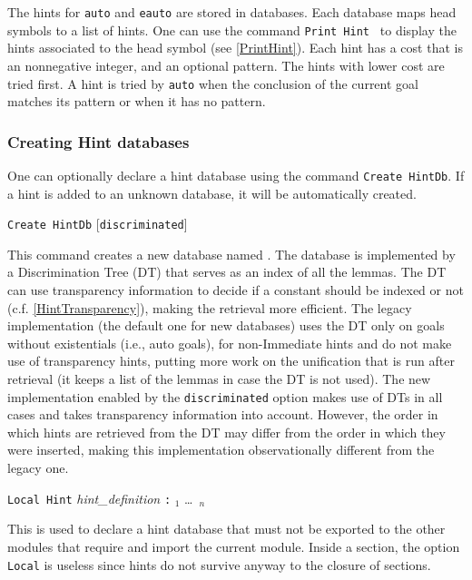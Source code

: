 \begin{coq_example*}
The hints for \texttt{auto} and \texttt{eauto} are stored in
databases.  Each database maps head symbols to a list of hints. One can
use the command \texttt{Print Hint \ident} to display the hints
associated to the head symbol \ident{} (see \ref{PrintHint}). Each
hint has a cost that is an nonnegative integer, and an optional pattern.
The hints with lower cost are tried first. A hint is tried by
\texttt{auto} when the conclusion of the current goal
matches its pattern or when it has no pattern.

\subsubsection*{Creating Hint databases
  \label{CreateHintDb}}

One can optionally declare a hint database using the command
\texttt{Create HintDb}. If a hint is added to an unknown database, it
will be automatically created.

\medskip
\texttt{Create HintDb} {\ident} [\texttt{discriminated}]
\medskip

This command creates a new database named \ident.
The database is implemented by a Discrimination Tree (DT) that serves as
an index of all the lemmas. The DT can use transparency information to decide
if a constant should be indexed or not (c.f. \ref{HintTransparency}),
making the retrieval more efficient.
The legacy implementation (the default one for new databases) uses the
DT only on goals without existentials (i.e., auto goals), for non-Immediate
hints and do not make use of transparency hints, putting more work on the
unification that is run after retrieval (it keeps a list of the lemmas
in case the DT is not used). The new implementation enabled by
the {\tt discriminated} option makes use of DTs in all cases and takes
transparency information into account. However, the order in which hints
are retrieved from the DT may differ from the order in which they were
inserted, making this implementation observationally different from the
legacy one.

\begin{Variants}
\item\texttt{Local Hint} \textsl{hint\_definition} \texttt{:}
  \ident$_1$ \ldots\ \ident$_n$

  This is used to declare a hint database that must not be exported to the other
  modules that require and import the current module. Inside a
  section, the option {\tt Local} is useless since hints do not
  survive anyway to the closure of sections.


\end{Variants}
\end{coq_example*}
